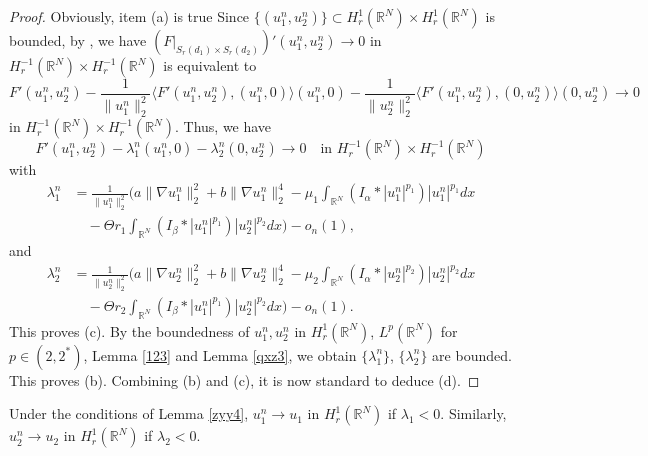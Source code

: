 \documentclass[reqno]{amsart}
\begin{document}
\begin{proof}
Obviously, item (a) is true 
Since $\{(u_1^n,u_2^n)\}\subset H_r^1(\mathbb{R}^N)\times H_r^1(\mathbb{R}^N)$ 
is bounded, by \cite{Arm2},
we have $(F|_{S_r(d_1)\times S_r(d_2)})'(u_1^n,u_2^n)\to 0$ in 
$H_r^{-1}(\mathbb{R}^N)\times H_r^{-1}(\mathbb{R}^N)$ is
equivalent to
\[
F'(u_1^n,u_2^n)-\frac{1}{\| u_1^n\|_2^2}\langle F'(u_1^n,u_2^n),
(u_1^n,0)\rangle(u_1^n,0)-
\frac{1}{\| u_2^n\|_2^2}\langle F'(u_1^n,u_2^n),(0,u_2^n)\rangle(0,u_2^n)\to 0
\]
in $H_r^{-1}(\mathbb{R}^N)\times H_r^{-1}(\mathbb{R}^N)$. Thus, we have
\[
 F'(u_1^n,u_2^n)-\lambda_1^n(u_1^n,0)-\lambda_2^n(0,u_2^n)\to 0
 \quad \text{in } H_r^{-1}(\mathbb{R}^N)\times H_r^{-1}(\mathbb{R}^N)
\]
with
\begin{equation}\label{yjj1}
\begin{aligned}
\lambda_1^n&=\frac{1}{\| u_1^n\|_2^2}\Big(a\| \nabla u_1^n\|_2^2+b\| \nabla u_1^n\|_2^4-
\mu_1\int_{\mathbb{R}^N}(I_\alpha\ast|u_1^n|^{p_1})|u_1^n|^{p_1}dx \\
&\quad -\Theta r_1\int_{\mathbb{R}^N}(I_\beta\ast|u_1^n|^{p_1})|u_2^n|^{p_2}dx\Big)
-o_n(1),
\end{aligned}
\end{equation}
and
\begin{equation}\label{yjj2}
\begin{aligned}
 \lambda_2^n
&=\frac{1}{\| u_2^n\|_2^2}\Big(a\| \nabla u_2^n\|_2^2+b\| \nabla u_2^n\|_2^4-
 \mu_2\int_{\mathbb{R}^N}(I_\alpha\ast|u_2^n|^{p_2})|u_2^n|^{p_2}dx \\
&\quad -\Theta r_2\int_{\mathbb{R}^N}(I_\beta\ast|u_1^n|^{p_1})|u_2^n|^{p_2}dx\Big)-o_n(1).
\end{aligned}
 \end{equation}
This proves (c).
By the boundedness of $u_1^n,u_2^n$ in $H_r^1(\mathbb{R}^N)$, $L^p(\mathbb{R}^N)$
for $p\in(2,2^*)$, Lemma \ref{123} and Lemma \ref{qxz3},
we obtain $\{\lambda_1^n\}$, $\{\lambda_2^n\}$ are bounded. This proves (b).
Combining (b) and (c), it is now standard to deduce (d).
\end{proof}

\begin{lemma}\label{yuk9}
Under the conditions of Lemma \ref{zyy4},  $u_1^n\to  u_1$ in $H_r^1(\mathbb{R}^N)$
if $\lambda_1<0$. Similarly,
$u_2^n\to  u_2$ in $H_r^1(\mathbb{R}^N)$ if $\lambda_2<0$.
\end{lemma}
\end{document}
